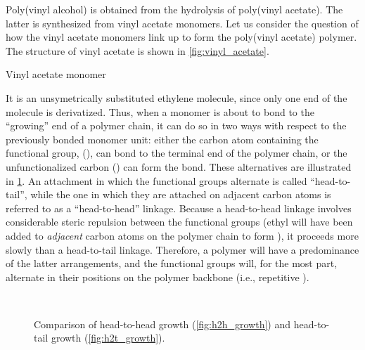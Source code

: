 Poly(vinyl alcohol) is obtained from the hydrolysis of poly(vinyl acetate). 
The latter is synthesized from vinyl acetate monomers. 
Let us consider the question of how the vinyl acetate monomers link up to form the poly(vinyl acetate) polymer. 
The structure of vinyl acetate is shown in \cref{fig:vinyl_acetate}.
\begin{marginfigure}
	\centering
	\caption{Vinyl acetate monomer}
	\label{fig:vinyl_acetate}
\end{marginfigure}
It is an unsymetrically substituted ethylene molecule, since only one end of the molecule is derivatized. 
Thus, when a monomer is about to bond to the ``growing'' end of a polymer chain, it can do so in two ways with respect to the previously bonded monomer unit: either the carbon atom containing the functional group,  (), can bond to the terminal end of the polymer chain, or the unfunctionalized carbon () can form the bond. 
These alternatives are illustrated in \cref{fig:growth_directions}. 
An attachment in which the functional groups alternate is called ``head-to-tail'', while the one in which they are attached on adjacent carbon atoms is referred to as a ``head-to-head'' linkage. 
Because a head-to-head linkage involves considerable steric repulsion between the functional groups (ethyl will have been added to \emph{adjacent} carbon atoms on the polymer chain to form ), it proceeds more slowly than a head-to-tail linkage. 
Therefore, a polymer will have a predominance of the latter arrangements, and the functional groups will, for the most part, alternate in their positions on the polymer backbone (i.e., repetitive ). 
\begin{figure}[htb]
	\captionsetup[subfigure]{farskip=20pt,captionskip=20pt}
	 \\
	\caption{Comparison of head-to-head growth (\cref{fig:h2h_growth}) and head-to-tail growth (\cref{fig:h2t_growth}).}
	\label{fig:growth_directions}
\end{figure}

